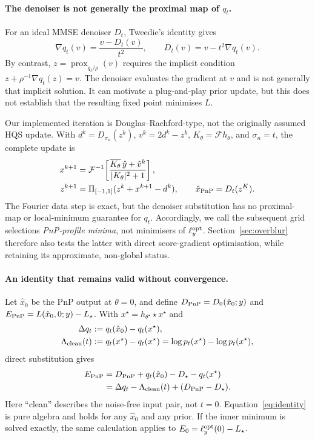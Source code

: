 \documentclass[10pt,journal]{IEEEtran}
\newcommand{\blur}{\star}
\newcommand{\Lam}{\Lambda}
\begin{document}
\paragraph*{The denoiser is not generally the proximal map of $q_t$.}
For an ideal MMSE denoiser $D_t$, Tweedie's identity gives
\begin{equation}
  \nabla q_t(v)=\frac{v-D_t(v)}{t^2},\qquad
  D_t(v)=v-t^2\nabla q_t(v).
  \label{eq:tweedie_gradient}
\end{equation}
By contrast, $z=\operatorname{prox}_{q_t/\rho}(v)$ requires the implicit condition
$z+\rho^{-1}\nabla q_t(z)=v$. The denoiser evaluates the gradient at $v$ and is not generally
that implicit solution. It can motivate a plug-and-play prior update, but this does not
establish that the resulting fixed point minimises $L$.

Our implemented iteration is Douglas--Rachford-type, not the originally assumed HQS update. With
$d^k=D_{\sigma_n}(z^k)$, $v^k=2d^k-z^k$, $K_\theta=\mathcal Fh_\theta$, and $\sigma_n=t$,
the complete update is
\begin{align}
  x^{k+1}&=\mathcal F^{-1}\!\left[
  \frac{\overline{K_\theta}\,\hat y+\hat v^k}{|K_\theta|^2+1}\right],\nonumber\\
  z^{k+1}&=\Pi_{[-1,1]}(z^k+x^{k+1}-d^k),\qquad \hat x_{\rm PnP}=D_t(z^K).
  \label{eq:pnp_updates}
\end{align}
The Fourier data step is exact, but the denoiser substitution has no proximal-map or
local-minimum guarantee for $q_t$. Accordingly, we call the subsequent grid selections
\emph{PnP-profile minima}, not minimisers of $\ell_y^{\rm opt}$. Section~\ref{sec:overblur}
therefore also tests the latter with direct score-gradient optimisation, while retaining its
approximate, non-global status.

\paragraph*{An identity that remains valid without convergence.}
Let $\hat x_0$ be the PnP output at $\theta=0$, and define
$D_{\rm PnP}=D_0(\hat x_0;y)$ and $E_{\rm PnP}=L(\hat x_0,0;y)-L_\star$. With
$x^\blur=h_{\theta^\blur}\blur x^\star$ and
\begin{align}
  \Delta q_t&:=q_t(\hat x_0)-q_t(x^\blur),\\
  \Lam_{\rm clean}(t)&:=q_t(x^\star)-q_t(x^\blur)
  =\log p_t(x^\blur)-\log p_t(x^\star),
  \label{eq:identity_defs}
\end{align}
direct substitution gives
\begin{align}
  E_{\rm PnP}
  &=D_{\rm PnP}+q_t(\hat x_0)-D_\star-q_t(x^\star)\nonumber\\
  &=\Delta q_t-\Lam_{\rm clean}(t)+(D_{\rm PnP}-D_\star).
  \label{eq:identity}
\end{align}
Here ``clean'' describes the noise-free input pair, not $t=0$. Equation~\eqref{eq:identity}
is pure algebra and holds for any $\hat x_0$ and any prior. If the inner minimum is solved
exactly, the same calculation applies to $E_0=\ell_y^{\rm opt}(0)-L_\star$.
\end{document}
